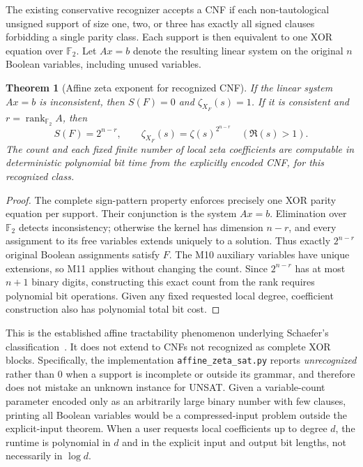 \documentclass[11pt,a4paper]{article}
\newtheorem{theorem}{Theorem}
\begin{document}
The existing conservative recognizer accepts a CNF if each
non-tautological unsigned support of size one, two, or three has
exactly all signed clauses forbidding a single parity class.
Each support is then equivalent to one XOR equation over
$\mathbb F_2$. Let $Ax=b$ denote the resulting linear system
on the original $n$ Boolean variables, including unused variables.

\begin{theorem}[Affine zeta exponent for recognized CNF]
If the linear system $Ax=b$ is inconsistent, then $S(F)=0$ and
$\zeta_{X_F}(s)=1$. If it is consistent and
$r=\operatorname{rank}_{\mathbb F_2}A$, then
\[
S(F)=2^{n-r},\qquad
\zeta_{X_F}(s)=\zeta(s)^{2^{n-r}}\quad(\Re(s)>1).
\]
The count and each fixed finite number of local zeta coefficients
are computable in deterministic polynomial bit time from the
explicitly encoded CNF, for this recognized class.
\end{theorem}
\begin{proof}
The complete sign-pattern property enforces precisely one XOR
parity equation per support. Their conjunction is the system
$Ax=b$. Elimination over $\mathbb F_2$ detects inconsistency;
otherwise the kernel has dimension $n-r$, and every assignment
to its free variables extends uniquely to a solution.
Thus exactly $2^{n-r}$ original Boolean assignments satisfy
$F$. The M10 auxiliary variables have unique extensions, so
M11 applies without changing the count. Since $2^{n-r}$ has
at most $n+1$ binary digits, constructing this exact count
from the rank requires polynomial bit operations. Given any
fixed requested local degree, coefficient construction also
has polynomial total bit cost.
\end{proof}

This is the established affine tractability phenomenon
underlying Schaefer's classification~\cite{schaefer}.
It does not extend to CNFs not recognized as complete XOR
blocks. Specifically, the implementation
\texttt{affine\_zeta\_sat.py} reports \emph{unrecognized}
rather than 0 when a support is incomplete or outside
its grammar, and therefore does not mistake an unknown
instance for UNSAT. Given a variable-count parameter encoded
only as an arbitrarily large binary number with few clauses,
printing all Boolean variables would be a compressed-input
problem outside the explicit-input theorem.
When a user requests local coefficients up to degree $d$,
the runtime is polynomial in $d$ and in the explicit input
and output bit lengths, not necessarily in $\log d$.
\end{document}
